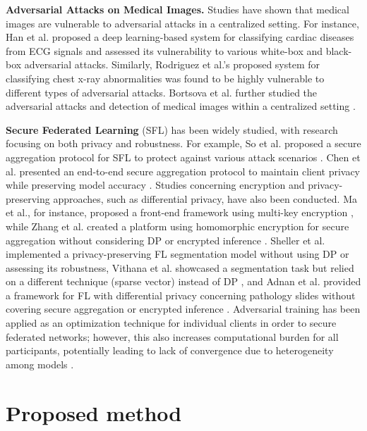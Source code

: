 \textbf{Adversarial Attacks on Medical Images.}  Studies have shown that medical images are vulnerable to adversarial attacks in a centralized setting. For instance, Han et al. \cite{han2020deep} proposed a deep learning-based system for classifying cardiac diseases from ECG signals and assessed its vulnerability to various white-box and black-box adversarial attacks. Similarly, Rodriguez et al.'s proposed system for classifying chest x-ray abnormalities \cite{rodriguez2022role} was found to be highly vulnerable to different types of adversarial attacks. Bortsova et al. further studied the adversarial attacks and detection of medical images within a centralized setting \cite{bortsova2021adversarial}.

\textbf{Secure Federated Learning}  (SFL) has been widely studied, with research focusing on both privacy and robustness. For example, So et al. proposed a secure aggregation protocol for SFL to protect against various attack scenarios \cite{so2022lightsecagg}. Chen et al. presented an end-to-end secure aggregation protocol to maintain client privacy while preserving model accuracy \cite{chen2022poisson}. Studies concerning encryption and privacy-preserving approaches, such as differential privacy, have also been conducted. Ma et al., for instance, proposed a front-end framework using multi-key encryption \cite{ma2022privacy}, while Zhang et al. created a platform using homomorphic encryption for secure aggregation without considering DP or encrypted inference \cite{zhang2022homomorphic}. Sheller et al. implemented a privacy-preserving FL segmentation model without using DP or assessing its robustness\cite{sheller2020federated}, Vithana et al. showcased a segmentation task but relied on a different technique (sparse vector) instead of DP \cite{vithana2022model}, and Adnan et al. provided a framework for FL with differential privacy concerning pathology slides without covering secure aggregation or encrypted inference \cite{adnan2022federated}. Adversarial training has been applied as an optimization technique for individual clients in order to secure federated networks; however, this also increases computational burden for all participants, potentially leading to lack of convergence due to heterogeneity among models \cite{bagdasaryan2020backdoor}.
\section{Proposed method}

